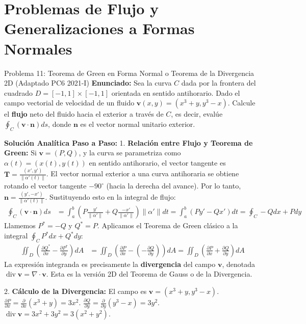 \documentclass[11pt,a4paper]{article}
\begin{document}
\section{Problemas de Flujo y Generalizaciones a Formas Normales}

\begin{ejerciciobox}{Problema 11: Teorema de Green en Forma Normal o Teorema de la Divergencia 2D (Adaptado PC6 2021-I)}
\textbf{Enunciado:}
Sea la curva $C$ dada por la frontera del cuadrado $D = [-1, 1] \times [-1, 1]$ orientada en sentido antihorario. Dado el campo vectorial de velocidad de un fluido $\mathbf{v}(x,y) = (x^3 + y, y^3 - x)$. Calcule el \textbf{flujo} neto del fluido hacia el exterior a través de $C$, es decir, evalúe $\oint_C (\mathbf{v} \cdot \mathbf{n}) ds$, donde $\mathbf{n}$ es el vector normal unitario exterior.

\textbf{Solución Analítica Paso a Paso:}
1. \textbf{Relación entre Flujo y Teorema de Green:}
Si $\mathbf{v} = (P, Q)$, y la curva se parametriza como $\alpha(t) = (x(t), y(t))$ en sentido antihorario, el vector tangente es $\mathbf{T} = \frac{(x', y')}{\|\alpha'(t)\|}$.
El vector normal exterior a una curva antihoraria se obtiene rotando el vector tangente $-90^\circ$ (hacia la derecha del avance).
Por lo tanto, $\mathbf{n} = \frac{(y', -x')}{\|\alpha'(t)\|}$.
Sustituyendo esto en la integral de flujo:
\begin{align*}
\oint_C (\mathbf{v} \cdot \mathbf{n}) ds &= \int_a^b \left( P \frac{y'}{\|\alpha'\|} + Q \frac{-x'}{\|\alpha'\|} \right) \|\alpha'\| dt = \int_a^b (P y' - Q x') dt = \oint_C -Q dx + P dy
\end{align*}
Llamemos $P^* = -Q$ y $Q^* = P$. Aplicamos el Teorema de Green clásico a la integral $\oint_C P^* dx + Q^* dy$:
\begin{align*}
\iint_D \left( \frac{\partial Q^*}{\partial x} - \frac{\partial P^*}{\partial y} \right) dA &= \iint_D \left( \frac{\partial P}{\partial x} - \left( -\frac{\partial Q}{\partial y} \right) \right) dA = \iint_D \left( \frac{\partial P}{\partial x} + \frac{\partial Q}{\partial y} \right) dA
\end{align*}
La expresión integranda es precisamente la \textbf{divergencia} del campo $\mathbf{v}$, denotada $\operatorname{div} \mathbf{v} = \nabla \cdot \mathbf{v}$. Esta es la versión 2D del Teorema de Gauss o de la Divergencia.

2. \textbf{Cálculo de la Divergencia:}
El campo es $\mathbf{v} = (x^3 + y, y^3 - x)$.
$\frac{\partial P}{\partial x} = \frac{\partial}{\partial x}(x^3 + y) = 3x^2$.
$\frac{\partial Q}{\partial y} = \frac{\partial}{\partial y}(y^3 - x) = 3y^2$.
$\operatorname{div} \mathbf{v} = 3x^2 + 3y^2 = 3(x^2 + y^2)$.


\end{ejerciciobox}
\end{document}
